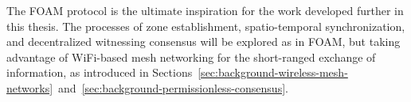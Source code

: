 The FOAM protocol is the ultimate inspiration for the work developed further in this thesis. The processes of zone establishment, spatio-temporal synchronization, and decentralized witnessing consensus will be explored as in FOAM, but taking advantage of WiFi-based mesh networking for the short-ranged exchange of information, as introduced in Sections~\ref{sec:background-wireless-mesh-networks}~and~\ref{sec:background-permissionless-consensus}.